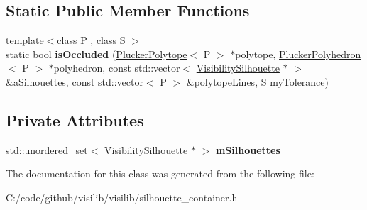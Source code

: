 \subsection*{Static Public Member Functions}
\begin{DoxyCompactItemize}
\item 
\mbox{\label{classvisilib_1_1_silhouette_container_ae1c087d735def786ab9a01267150f634}} 
{\footnotesize template$<$class P , class S $>$ }\\static bool {\bfseries is\+Occluded} (\mbox{\hyperlink{classvisilib_1_1_plucker_polytope}{Plucker\+Polytope}}$<$ P $>$ $\ast$polytope, \mbox{\hyperlink{classvisilib_1_1_plucker_polyhedron}{Plucker\+Polyhedron}}$<$ P $>$ $\ast$polyhedron, const std\+::vector$<$ \mbox{\hyperlink{classvisilib_1_1_visibility_silhouette}{Visibility\+Silhouette}} $\ast$ $>$ \&a\+Silhouettes, const std\+::vector$<$ P $>$ \&polytope\+Lines, S my\+Tolerance)
\end{DoxyCompactItemize}
\subsection*{Private Attributes}
\begin{DoxyCompactItemize}
\item 
\mbox{\label{classvisilib_1_1_silhouette_container_af846a05b61355bc74b6ddd2710173ebd}} 
std\+::unordered\+\_\+set$<$ \mbox{\hyperlink{classvisilib_1_1_visibility_silhouette}{Visibility\+Silhouette}} $\ast$ $>$ {\bfseries m\+Silhouettes}
\end{DoxyCompactItemize}


The documentation for this class was generated from the following file\+:\begin{DoxyCompactItemize}
\item 
C\+:/code/github/visilib/visilib/silhouette\+\_\+container.\+h\end{DoxyCompactItemize}
